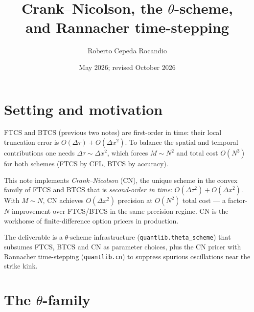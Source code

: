 \documentclass[11pt,a4paper]{article}
\title{Crank--Nicolson, the $\theta$-scheme,\\and Rannacher time-stepping}
\author{Roberto Cepeda Rocandio}
\date{May 2026; revised October 2026}
\begin{document}
\maketitle

\section{Setting and motivation}

FTCS and BTCS (previous two notes) are first-order in time: their local
truncation error is $O(\Delta\tau) + O(\Delta x^2)$. To balance the
spatial and temporal contributions one needs $\Delta\tau \sim
\Delta x^2$, which forces $M \sim N^2$ and total cost $O(N^3)$ for
both schemes (FTCS by CFL, BTCS by accuracy).

This note implements \emph{Crank--Nicolson} (CN), the unique scheme
in the convex family of FTCS and BTCS that is
\emph{second-order in time}: $O(\Delta\tau^2) + O(\Delta x^2)$. With
$M \sim N$, CN achieves $O(\Delta x^2)$ precision at $O(N^2)$ total
cost --- a factor-$N$ improvement over FTCS/BTCS in the same
precision regime. CN is the workhorse of finite-difference option
pricers in production.

The deliverable is a $\theta$-scheme infrastructure
(\texttt{quantlib.theta\_scheme}) that subsumes FTCS, BTCS and CN as
parameter choices, plus the CN pricer with Rannacher time-stepping
(\texttt{quantlib.cn}) to suppress spurious oscillations near the
strike kink.

\section{The $\theta$-family}
\end{document}
